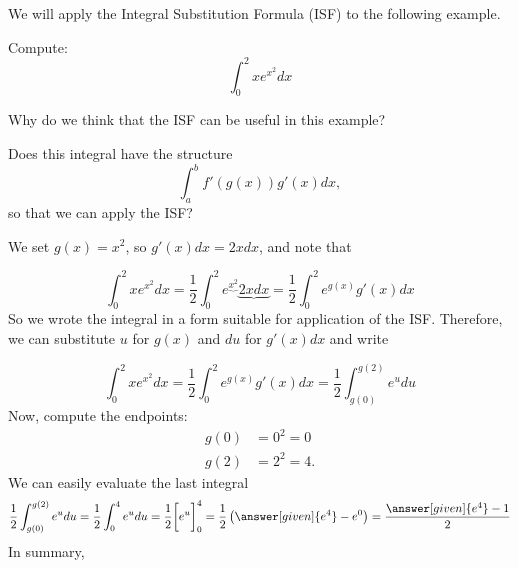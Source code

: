 \documentclass{ximera}
\begin{document}
We will apply the Integral Substitution Formula (ISF)  to the following example.

\begin{example}
Compute:
\[
\int_0^2 x e^{x^2} dx
\]
\begin{explanation}
Why do we think that the ISF can be useful in this example?

Does this integral have the structure
\[
\int_a^b f'(g(x)) g'(x)  dx ,  
\]
so that we can apply the ISF?

We set $g(x) =x^2$, so $g'(x)dx =2xdx$, and note that

\[
\int_0^2 x e^{x^2} dx
=\frac{1}{2}\int_0^{2} e^{\underbrace{x^2}}\underbrace{2x dx}=\frac{1}{2}\int_0^{2} e^{g(x)}g'(x) dx
\]
So we wrote the integral in a form suitable for application of the ISF. Therefore, we can substitute $u$ for $g(x)$ and $ du$ for $g'(x) dx$ and write

\[
\int_0^2 x e^{x^2} dx=\frac{1}{2}\int_0^{2} e^{g(x)}g'(x) dx=\frac{1}{2}\int_{g(0)}^{g(2)} e^{u} du
\]
Now, compute the endpoints: 
\begin{align*}
g(0) &= 0^2 = 0  \\
g(2) &=2^2 = 4.
\end{align*}
We can easily evaluate the last integral
\[
\frac{1}{2}\int_{g(0)}^{g(2)} e^{u} du=
\frac{1}{2}\int_{0}^{4} e^{u} du=\frac{1}{2}\bigg[ e^u \bigg]_0^4=\frac{1}{2}\left(\answer[given]{e^4}-e^0\right)=\frac{\answer[given]{e^4}-1}{2}
\]
In summary,


\end{explanation}
\end{example}
\end{document}

